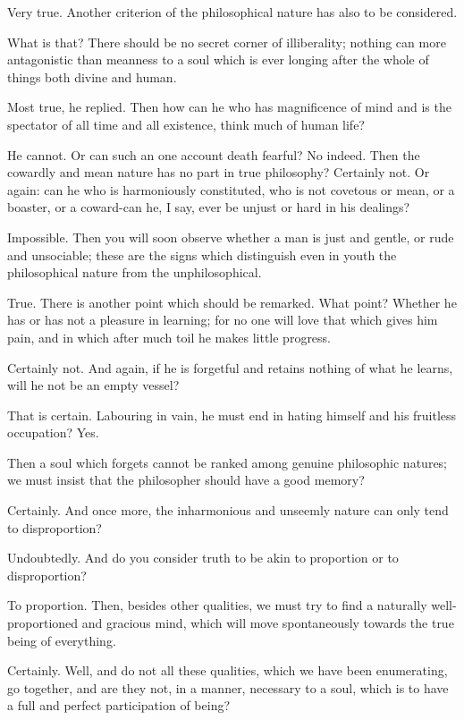 Very true.
Another criterion of the philosophical nature has also to be considered.

What is that?
There should be no secret corner of illiberality; nothing can more antagonistic than meanness to a soul which is ever longing after the whole of things both divine and human.

Most true, he replied.
Then how can he who has magnificence of mind and is the spectator of all time and all existence, think much of human life?

He cannot.
Or can such an one account death fearful?
No indeed.
Then the cowardly and mean nature has no part in true philosophy?
Certainly not.
Or again: can he who is harmoniously constituted, who is not covetous or mean, or a boaster, or a coward-can he, I say, ever be unjust or hard in his dealings?

Impossible.
Then you will soon observe whether a man is just and gentle, or rude and unsociable; these are the signs which distinguish even in youth the philosophical nature from the unphilosophical.

True.
There is another point which should be remarked.
What point?
Whether he has or has not a pleasure in learning; for no one will love that which gives him pain, and in which after much toil he makes little progress.

Certainly not.
And again, if he is forgetful and retains nothing of what he learns, will he not be an empty vessel?

That is certain.
Labouring in vain, he must end in hating himself and his fruitless occupation? Yes.

Then a soul which forgets cannot be ranked among genuine philosophic natures; we must insist that the philosopher should have a good memory?

Certainly.
And once more, the inharmonious and unseemly nature can only tend to disproportion?

Undoubtedly.
And do you consider truth to be akin to proportion or to disproportion?

To proportion.
Then, besides other qualities, we must try to find a naturally well-proportioned and gracious mind, which will move spontaneously towards the true being of everything.

Certainly.
Well, and do not all these qualities, which we have been enumerating, go together, and are they not, in a manner, necessary to a soul, which is to have a full and perfect participation of being?

